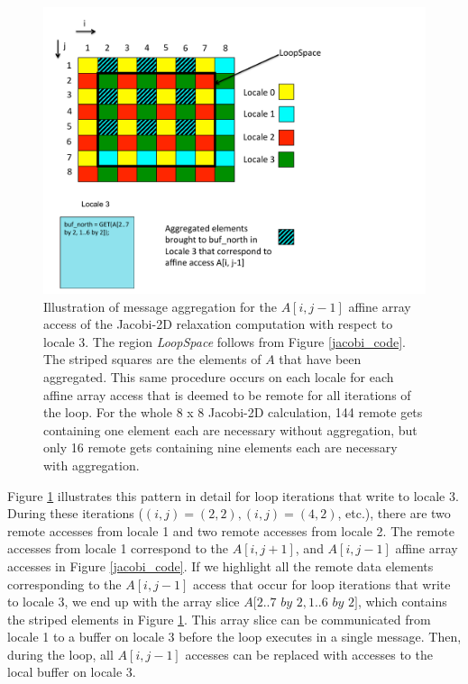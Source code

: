 \begin{figure}
\begin{center}
\includegraphics[scale=0.48]{./Figures/aggregation}
\caption{Illustration of message aggregation for the $A[i, j-1]$ affine array access of the Jacobi-2D relaxation computation with respect to locale 3. The region \textit{LoopSpace} follows from Figure \ref{jacobi_code}. The striped squares are the elements of $A$ that have been aggregated. This same procedure occurs on each locale for each affine array access that is deemed to be remote for all iterations of the loop. For the whole 8 x 8 Jacobi-2D calculation, 144 remote gets containing one element each are necessary without aggregation, but only 16 remote gets containing nine elements each are necessary with aggregation.}
\label{aggregation}
\end{center}
\end{figure}

Figure \ref{aggregation} illustrates this pattern in detail for loop iterations that write to locale 3. During these iterations ($(i, j) = (2, 2), (i, j) = (4, 2)$, etc.), there are two remote accesses from locale 1 and two remote accesses from locale 2. The remote accesses from locale 1 correspond to the $A[i, j+1]$, and $A[i, j-1]$ affine array accesses in Figure \ref{jacobi_code}. If we highlight all the remote data elements corresponding to the $A[i, j-1]$ access that occur for loop iterations that write to locale 3, we end up with the array slice $A[2..7$ $by$ $2, 1..6$ $by$ $2]$, which contains the striped elements in Figure \ref{aggregation}. This array slice can be communicated from locale 1 to a buffer on locale 3 before the loop executes in a single message. Then, during the loop, all $A[i, j-1]$ accesses can be replaced with accesses to the local buffer on locale 3. 

